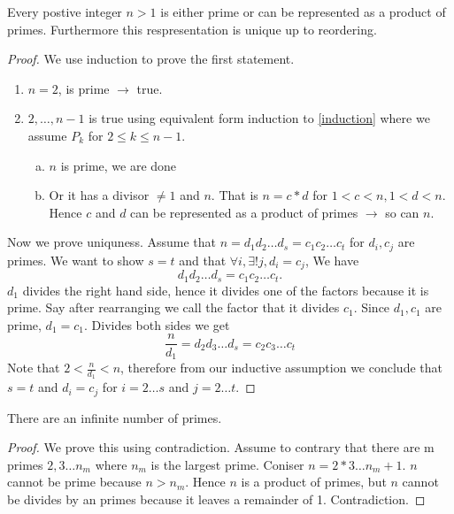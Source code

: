 \begin{theorem}
	Every postive integer \( n > 1 \) is either prime or can be represented as a product of
	primes. Furthermore this respresentation is unique up to reordering.
	\label{PrimeFactorization}
\end{theorem}

\begin{proof}
	We use induction to prove the first statement.
	\begin{enumerate}
		\item \( n=2 \), is prime \( \rightarrow \) true.
		\item \( 2, \dots, n-1 \) is true using equivalent form induction to \ref{induction}
			where we assume \( P_k \) for
			\( 2 \le k \le n-1 \).
			\begin{enumerate}[a.]
				\item \( n \) is prime, we are done
				\item Or it has a divisor \( \not = 1 \) and \( n \). That is \( n = c * d \)
					for \( 1 < c < n, 1 < d < n \). Hence \( c \) and \( d \) can be represented
					as a product of primes \( \rightarrow \) so can \( n \).
			\end{enumerate}
	\end{enumerate}
	Now we prove uniquness. Assume that \( n = d_1 d_2 \dots d_s = c_1 c_2 \dots c_t \) for
	\( d_i, c_j \) are primes. We want to show \( s=t \) and that \( \forall i, \exists ! j, d_i = c_j \),
	We have
	\[
		d_1d_2 \dots d_s = c_1 c_2 \dots c_t.
	\]
	\( d_1 \) divides the right hand side, hence it divides one of the factors because it is
	prime. Say after rearranging we call the factor that it divides \( c_1 \). Since \( d_1, c_1
	\) are prime, \( d_1 = c_1 \). Divides both sides we get
	\[
		\frac{n}{d_1} = d_2 d_3 \dots d_s = c_2 c_3 \dots c_t
	\]
	Note that \( 2 < \frac{n}{d_1} < n \), therefore from our inductive assumption we conclude
	that \( s = t \) and \( d_i = c_j \) for \( i = 2 \dots s \) and \( j = 2 \dots t \).
\end{proof}

\begin{theorem}
	There are an infinite number of primes.
	\label{Infinite Primes}
\end{theorem}

\begin{proof}
	We prove this using contradiction. Assume to contrary that there are m primes \( 2, 3 \dots
	n_m\) where \( n_m \) is the largest prime. Coniser \( n = 2 * 3 \dots n_m + 1 \).
	\( n \) cannot be prime because \( n > n_m \). Hence \( n \) is a product of primes, but \(
	n \) cannot be divides by an primes because it leaves a remainder of 1. Contradiction.
\end{proof}


